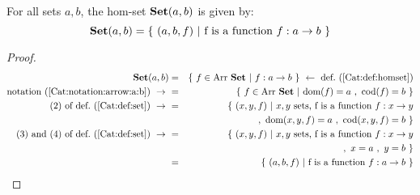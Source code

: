 \begin{prop}\label{Cat:prop:homset:set}
    For all sets $a,b$, the hom-set $\mbox{\bf Set}(a,b)$ is given by:
        \[
            \Set(a,b)=\{\ (a,b,f)\ |\ 
            \mbox{f is a function $f:a\to b$}\ \}
        \]
\end{prop}
\begin{proof}
    \begin{eqnarray*}\Set(a,b)
        &=&\{\ f\in\arr\ \Set\ |\ f : a \to b\ \}
        \ \leftarrow\ \mbox{def.~(\ref{Cat:def:homset})}\\
        \mbox{notation~(\ref{Cat:notation:arrow:a:b})}\ \to\ 
        &=&\{\ f\in\arr\ \Set\ |\ \dom(f)=a\ ,\ \cod(f)=b\  \}\\
        \mbox{$(2)$ of def.~(\ref{Cat:def:set})}\ \to\ 
        &=&\{\ (x,y,f)\ |\ x,y\ \mbox{sets, f is a function 
        $f:x\to y$}\\
        &\ &,\ \dom(x,y,f)=a\ ,\ \cod(x,y,f)=b\ \}\\
        \mbox{$(3)$ and $(4)$ of def.~(\ref{Cat:def:set})}\ \to\ 
        &=&\{\ (x,y,f)\ |\ x,y\ \mbox{sets, f is a function 
        $f:x\to y$}\\
        &\ &,\ x=a\ ,\ y=b\ \}\\
        &=&\{\ (a,b,f)\ |\ \mbox{f is a function $f:a\to b$}\ \}
    \end{eqnarray*}
\end{proof}
